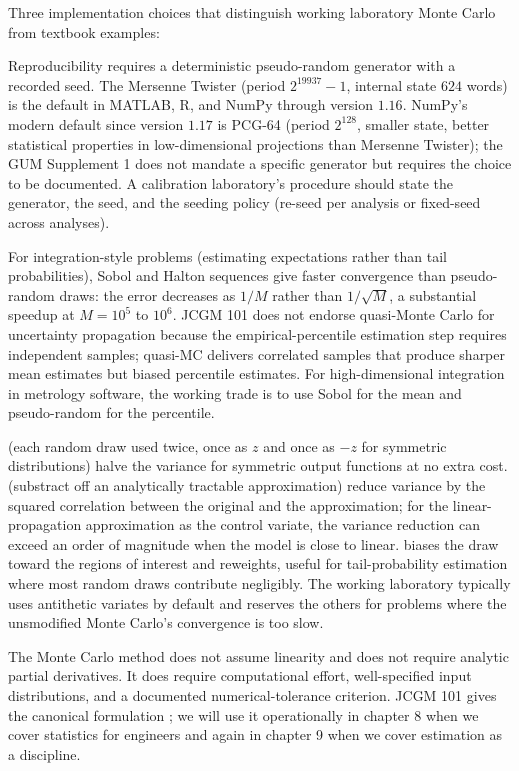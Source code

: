 Three implementation choices that distinguish working laboratory
Monte Carlo from textbook examples:

 Reproducibility requires a
deterministic pseudo-random generator with a recorded seed. The
Mersenne Twister (period $2^{19937}-1$, internal state $624$
words) is the default in MATLAB, R, and NumPy through version
$1.16$. NumPy's modern default since version $1.17$ is PCG-64
(period $2^{128}$, smaller state, better statistical properties
in low-dimensional projections than Mersenne Twister); the GUM
Supplement 1 does not mandate a specific generator but requires
the choice to be documented. A calibration laboratory's procedure
should state the generator, the seed, and the seeding policy
(re-seed per analysis or fixed-seed across analyses).

 For integration-style problems
(estimating expectations rather than tail probabilities), Sobol
and Halton sequences give faster convergence than pseudo-random
draws: the error decreases as $1/M$ rather than $1/\sqrt{M}$, a
substantial speedup at $M = 10^{5}$ to $10^{6}$. JCGM 101 does
not endorse quasi-Monte Carlo for uncertainty propagation because
the empirical-percentile estimation step requires independent
samples; quasi-MC delivers correlated samples that produce
sharper mean estimates but biased percentile estimates. For
high-dimensional integration in metrology software, the working
trade is to use Sobol for the mean and pseudo-random for the
percentile.

  (each
random draw used twice, once as $z$ and once as $-z$ for
symmetric distributions) halve the variance for symmetric output
functions at no extra cost.  (substract
off an analytically tractable approximation) reduce variance by
the squared correlation between the original and the
approximation; for the linear-propagation approximation as the
control variate, the variance reduction can exceed an order of
magnitude when the model is close to linear.  biases the draw toward the regions of interest and
reweights, useful for tail-probability estimation where most
random draws contribute negligibly. The working laboratory
typically uses antithetic variates by default and reserves the
others for problems where the unsmodified Monte Carlo's
convergence is too slow.

The Monte Carlo method does not assume linearity and does not
require analytic partial derivatives. It does require
computational effort, well-specified input distributions, and a
documented numerical-tolerance criterion. JCGM 101 gives the
canonical formulation \cite{std:jcgm-101}; we will use it
operationally in chapter 8 when we cover statistics for engineers
and again in chapter 9 when we cover estimation as a discipline.

